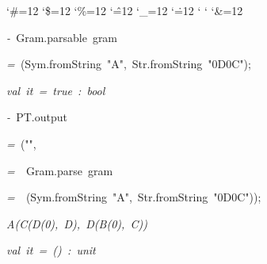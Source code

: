\begin{list}{}
{\setlength{\leftmargin}{\leftmargini}
\setlength{\rightmargin}{0cm}
\setlength{\itemindent}{0cm}
\setlength{\listparindent}{0cm}
\setlength{\itemsep}{0cm}
\setlength{\parsep}{0cm}
\setlength{\labelsep}{0cm}
\setlength{\labelwidth}{0cm}
\catcode`\#=12
\catcode`\$=12
\catcode`\%=12
\catcode`\^=12
\catcode`\_=12
\catcode`\.=12
\catcode`
\catcode`
\catcode`\&=12
\ttfamily}
\small
\item[]\textsl{-\ }Gram.parsable\ gram
\item[]\textsl{=\ }(Sym.fromString\ "A",\ Str.fromString\ "0D0C");
\item[]\textsl{val\ it\ =\ true\ :\ bool}
\item[]\textsl{-\ }PT.output
\item[]\textsl{=\ }("",
\item[]\textsl{=\ }\ Gram.parse\ gram
\item[]\textsl{=\ }\ (Sym.fromString\ "A",\ Str.fromString\ "0D0C"));
\item[]\textsl{A(C(D(0),\ D),\ D(B(0),\ C))}
\item[]\textsl{val\ it\ =\ ()\ :\ unit}
\end{list}
